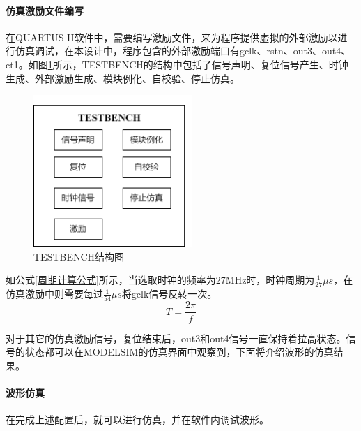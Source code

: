 \paragraph{仿真激励文件编写}
在QUARTUS II软件中，需要编写激励文件，来为程序提供虚拟的外部激励以进行仿真调试，在本设计中，程序包含的外部激励端口有gclk、rstn、out3、out4、ct1。如图\ref{TESTBENCH结构图}所示，TESTBENCH的结构中包括了信号声明、复位信号产生、时钟生成、外部激励生成、模块例化、自校验、停止仿真。\par
\begin{figure}[ht]
	\centering
	\includegraphics[width=6cm]{figure/TESTBENCH structure.png}
	\caption{TESTBENCH结构图}
	\label{TESTBENCH结构图}
\end{figure}
如公式\ref{周期计算公式}所示，当选取时钟的频率为27MHz时，时钟周期为$\frac{1}{27}\mu s$，在仿真激励中则需要每过$\frac{1}{54}
\mu s$将gclk信号反转一次。
\begin{equation}
	T=\frac{2\pi}{f}
	\label{周期计算公式}
\end{equation}\par
对于其它的仿真激励信号，复位结束后，out3和out4信号一直保持着拉高状态。信号的状态都可以在MODELSIM的仿真界面中观察到，下面将介绍波形的仿真结果。

\paragraph{波形仿真}
在完成上述配置后，就可以进行仿真，并在软件内调试波形。

